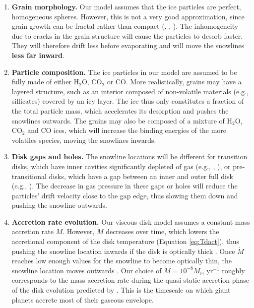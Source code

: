 \documentclass[apj]{emulateapj}
\begin{document}
\begin{enumerate}
\item \textbf{Grain morphology.} Our model assumes that the ice particles are perfect, homogeneous spheres. However, this is not a very good approximation, since grain growth can be fractal rather than compact (\citealt{zsom10}, \citealt{okuzumi12}, \citealt{krijt15}). The inhomogeneity due to cracks in the grain structure will cause the particles to desorb faster. They will therefore drift less before evaporating and will move the snowlines \textbf{less far inward}.

\item \textbf{Particle composition.} The ice particles in our model are assumed to be fully made of either H$_2$O, CO$_2$ or CO. More realistically, grains may have a layered structure, such as an interior composed of non-volatile materials (e.g., sillicates) covered by an icy layer. The ice thus only constitutes a fraction of the total particle mass, which accelerates its desorption and pushes the snowlines outwards. The grains may also be composed of a mixture of H$_2$O, CO$_2$ and CO ices, which will increase the binding energies of the more volatiles species, moving %
the snowlines inwards. 


\item \textbf{Disk gaps and holes.} The snowline locations will be different for transition disks, which have inner cavities significantly depleted of gas (e.g., \citealt{espaillat12}, \textbf{\citealt{vandermarel15}}), or pre-transitional disks, which have a gap between an inner and outer full disk (e.g., \citealt{kraus11}). The decrease in gas pressure in these gaps or holes will reduce the particles' drift velocity close to the gap edge, thus slowing them down and pushing the snowline outwards.

\item \textbf{Accretion rate evolution.} Our viscous disk model assumes a constant mass accretion rate $\dot{M}$. However, $\dot{M}$ decreases over time, which lowers the accretional component of the disk temperature (Equation \ref{eq:Tdact}), thus pushing the snowline location inwards if the disk is optically thick \citep{garaud07}. Once $\dot{M}$ reaches low enough values for the snowline to become optically thin, the snowline location moves outwards \citep{garaud07}. Our choice of $\dot{M}=10^{-8} M_{\odot}$ yr$^{-1}$ roughly corresponds to the mass accretion rate during the quasi-static accretion phase of the disk evolution predicted by \citet{garaud07}. This is the timescale on which giant planets accrete most of their gaseous envelope.%


\end{enumerate}
\end{document}
